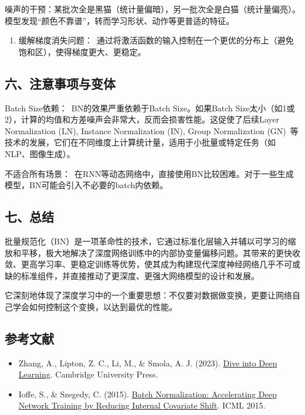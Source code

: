 噪声的干预：某批次全是黑猫（统计量偏暗），另一批次全是白猫（统计量偏亮）。模型发现``颜色不靠谱''，转而学习形状、动作等更普适的特征。

\begin{enumerate}
\def\labelenumi{\arabic{enumi}.}
\setcounter{enumi}{3}
\tightlist
\item
  缓解梯度消失问题：~通过将激活函数的输入控制在一个更优的分布上（避免饱和区），使得梯度更大、更稳定。
\end{enumerate}

\hypertarget{ux516dux6ce8ux610fux4e8bux9879ux4e0eux53d8ux4f53}{%
\subsection{六、注意事项与变体}\label{ux516dux6ce8ux610fux4e8bux9879ux4e0eux53d8ux4f53}}

Batch Size依赖：~BN的效果严重依赖于Batch Size。如果Batch Size太小（如1或2），计算的均值和方差噪声会非常大，反而会损害性能。这促使了后续Layer Normalization (LN), Instance Normalization (IN), Group Normalization (GN)~等技术的发展，它们在不同维度上计算统计量，适用于小批量或特定任务（如NLP、图像生成）。

不适合所有场景：~在RNN等动态网络中，直接使用BN比较困难。对于一些生成模型，BN可能会引入不必要的batch内依赖。

\hypertarget{ux4e03ux603bux7ed3}{%
\subsection{七、总结}\label{ux4e03ux603bux7ed3}}

批量规范化（BN）是一项革命性的技术，它通过标准化层输入并辅以可学习的缩放和平移，极大地解决了深度网络训练中的内部协变量偏移问题。其带来的更快收敛、更高学习率、更稳定训练等优势，使其成为构建现代深度神经网络几乎不可或缺的标准组件，并直接推动了更深度、更强大网络模型的设计和发展。

它深刻地体现了深度学习中的一个重要思想：不仅要对数据做变换，更要让网络自己学会如何控制这个变换，以达到最优的性能。

\hypertarget{ux53c2ux8003ux6587ux732e-8}{%
\subsection{参考文献}\label{ux53c2ux8003ux6587ux732e-8}}

\vspace{0.25em}
\begin{itemize}
\tightlist
\item
  Zhang, A., Lipton, Z. C., Li, M., \& Smola, A. J. (2023). \href{https://D2L.ai}{Dive into Deep Learning}. Cambridge University Press.
\item
  Ioffe, S., \& Szegedy, C. (2015). \href{https://arxiv.org/abs/1502.03167}{Batch Normalization: Accelerating Deep Network Training by Reducing Internal Covariate Shift}. ICML 2015.
\end{itemize}

